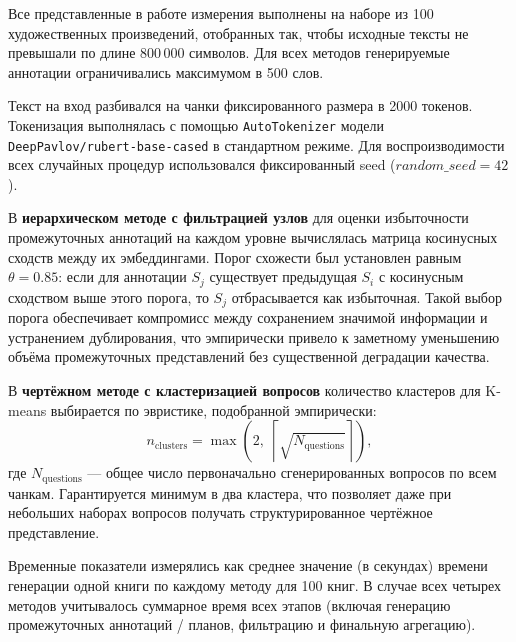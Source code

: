 \documentclass{article}
\theoremstyle{definition}
\theoremstyle{plain}
\begin{document}
Все представленные в работе измерения выполнены на наборе из 100 художественных произведений, 
отобранных так, чтобы исходные тексты не превышали по длине 800\,000 символов. 
Для всех методов генерируемые аннотации ограничивались максимумом в 500 слов.

Текст на вход разбивался на чанки фиксированного размера в 2000 токенов. 
Токенизация выполнялась с помощью \texttt{AutoTokenizer} модели \texttt{DeepPavlov/rubert-base-cased} в стандартном режиме.
Для воспроизводимости всех случайных процедур использовался фиксированный seed ($random\_seed = 42$).

В \textbf{иерархическом методе с фильтрацией узлов} для оценки избыточности промежуточных аннотаций на каждом уровне вычислялась матрица косинусных сходств между их эмбеддингами.
Порог схожести был установлен равным $\theta=0.85$: если для аннотации $S_j$ существует предыдущая $S_i$ с косинусным сходством выше этого порога, 
то $S_j$ отбрасывается как избыточная. Такой выбор порога обеспечивает компромисс между сохранением значимой информации и устранением дублирования, 
что эмпирически привело к заметному уменьшению объёма промежуточных представлений без существенной деградации качества.

В \textbf{чертёжном методе с кластеризацией вопросов} количество кластеров для K-means выбирается по эвристике, подобранной эмпирически:
\[
n_{\text{clusters}} = \max\!\left(2,\; \left\lceil \sqrt{N_{\text{questions}}} \right\rceil\right),
\]
где $N_{\text{questions}}$ — общее число первоначально сгенерированных вопросов по всем чанкам. 
Гарантируется минимум в два кластера, что позволяет даже при небольших наборах вопросов получать структурированное чертёжное представление.

Временные показатели измерялись как среднее значение (в секундах) времени генерации одной книги по каждому методу для 100 книг. 
В случае всех четырех методов учитывалось суммарное время всех этапов (включая генерацию промежуточных аннотаций / планов, фильтрацию и финальную агрегацию).
\end{document}
